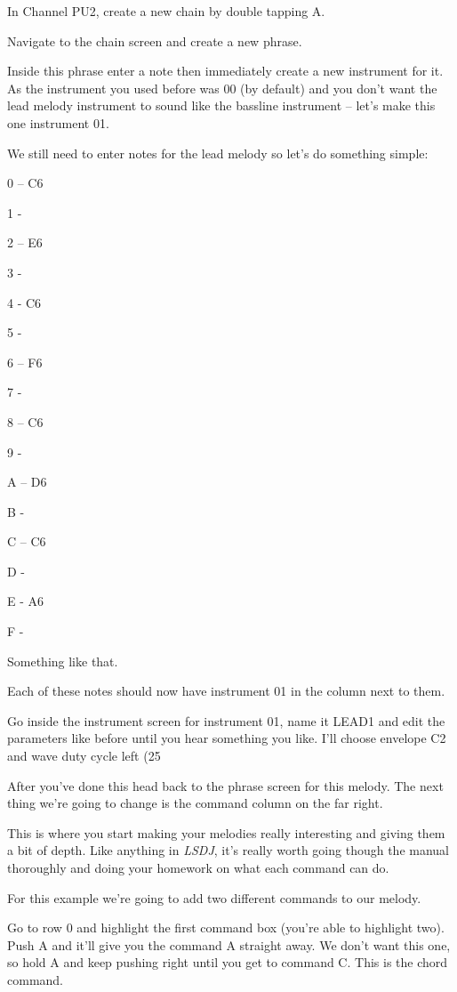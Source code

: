\documentclass[]{article}
\newcommand{\lsdj}{\textit{LSDJ}\xspace}
\begin{document}
In Channel PU2, create a new chain by double tapping A.

Navigate to the chain screen and create a new phrase.

Inside this phrase enter a note then immediately create a new instrument for it. As the instrument you used before was 00 (by default) and you don't want the lead melody instrument to sound like the bassline instrument – let's make this one instrument 01.

We still need to enter notes for the lead melody so let's do something simple:

0 – C6

1 -

2 – E6

3 -

4 - C6

5 -

6 – F6

7 -

8 – C6

9 -

A – D6

B -

C – C6

D -

E - A6

F -


Something like that.

Each of these notes should now have instrument 01 in the column next to them.

Go inside the instrument screen for instrument 01, name it LEAD1 and edit the parameters like before until you hear something you like. I'll choose envelope C2 and wave duty cycle left (25%

After you've done this head back to the phrase screen for this melody. The next thing we're going to change is the command column on the far right.

This is where you start making your melodies really interesting and giving them a bit of depth. Like anything in \lsdj, it's really worth going though the manual thoroughly and doing your homework on what each command can do.

For this example we're going to add two different commands to our melody.

Go to row 0 and highlight the first command box (you're able to highlight two). Push A and it'll give you the command A straight away. We don't want this one, so hold A and keep pushing right until you get to command C. This is the chord command.
\end{document}

